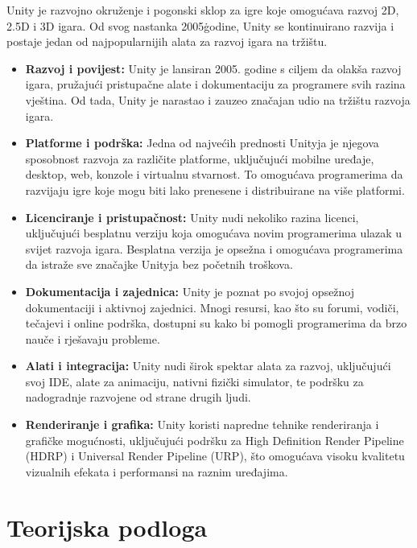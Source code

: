 \documentclass[diplomskirad]{fer}
\begin{document}
    Unity je razvojno okruženje i pogonski sklop za igre koje omogućava razvoj 2D, 2.5D i 3D igara.
    Od svog nastanka 2005\. godine, Unity se kontinuirano razvija i postaje jedan od najpopularnijih alata za razvoj igara na tržištu.

    \begin{itemize}
        \item \textbf{Razvoj i povijest:} Unity je lansiran 2005.
        godine s ciljem da olakša razvoj igara, pružajući pristupačne alate i dokumentaciju za programere svih razina vještina.
        Od tada, Unity je narastao i zauzeo značajan udio na tržištu razvoja igara.
        \item \textbf{Platforme i podrška:} Jedna od najvećih prednosti Unityja je njegova sposobnost razvoja za različite platforme, uključujući mobilne uređaje, desktop, web, konzole i virtualnu stvarnost.
        To omogućava programerima da razvijaju igre koje mogu biti lako prenesene i distribuirane na više platformi.
        \item \textbf{Licenciranje i pristupačnost:} Unity nudi nekoliko razina licenci, uključujući besplatnu verziju koja omogućava novim programerima ulazak u svijet razvoja igara.
        Besplatna verzija je opsežna i omogućava programerima da istraže sve značajke Unityja bez početnih troškova.
        \item \textbf{Dokumentacija i zajednica:} Unity je poznat po svojoj opsežnoj dokumentaciji i aktivnoj zajednici.
        Mnogi resursi, kao što su forumi, vodiči, tečajevi i online podrška, dostupni su kako bi pomogli programerima da brzo nauče i rješavaju probleme.
        \item \textbf{Alati i integracija:} Unity nudi širok spektar alata za razvoj, uključujući svoj IDE, alate za animaciju, nativni fizički simulator, te podršku za nadogradnje razvojene od strane drugih ljudi.
        \item \textbf{Renderiranje i grafika:} Unity koristi napredne tehnike renderiranja i grafičke mogućnosti, uključujući podršku za High Definition Render Pipeline (HDRP) i Universal Render Pipeline (URP), što omogućava visoku kvalitetu vizualnih efekata i performansi na raznim uređajima.
    \end{itemize}


    \chapter{Teorijska podloga}\label{ch:teorijska-podloga}
\end{document}
